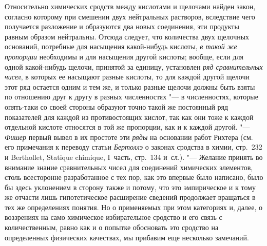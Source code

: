 Относительно химических сродств между кислотами и щелочами найден закон,
согласно которому при смешении двух нейтральных растворов, вследствие чего
получается разложение и образуются два новых соединения, эти продукты
равным образом нейтральны. Отсюда следует, что количества двух щелочных
оснований, потребные для насыщения какой-нибудь кислоты,
{\em в такой же пропорции} необходимы и для насыщения
другой кислоты; вообще, если для одной какой-нибудь щелочи, принятой за
единицу, установлен {\em ряд сравнительных чисел}, в
которых ее насыщают разные кислоты, то для каждой другой щелочи этот ряд
остается одним и тем же, и только разные щелочи должны быть взяты по
отношению друг к другу в разных численностях "--- в численностях, которые
опять-таки со своей стороны образуют точно такой же постоянный ряд
показателей для каждой из противостоящих кислот, так как они тоже к каждой
отдельной кислоте относятся в той же пропорции, как и к каждой другой. "---
{\em Фишер} первый вывел в их простоте эти
{\em ряды} на основании работ Рихтера (см. его
примечания к переводу статьи {\em Бертоллэ} о законах
сродства в химии, стр.~232 и Berthollet, Statique chimique, I~часть, стр.~134
и~сл.). "--- Желание принять во внимание знание сравнительных чисел для
соединений химических элементов, столь всесторонне разработанное с тех пор,
как это впервые было написано, было бы здесь уклонением в сторону также и
потому, что это эмпирическое и к тому же отчасти лишь гипотетическое
расширение сведений продолжает вращаться в тех же определениях понятия. Но
о применяемых при этом категориях и, далее, о воззрениях на само химическое
избирательное сродство и его связь с количественным, равно как и о попытке
обосновать это сродство на определенных физических качествах, мы прибавим
еще несколько замечаний.

